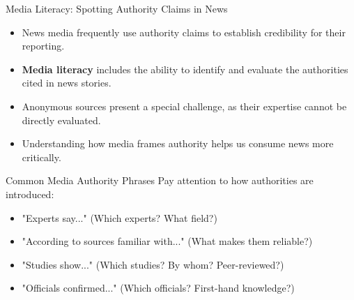 \documentclass{beamer}
\begin{document}
\begin{frame}{Media Literacy: Spotting Authority Claims in News}
    \begin{itemize}
        \item News media frequently use authority claims to establish credibility for their reporting.
        \item \textbf{Media literacy} includes the ability to identify and evaluate the authorities cited in news stories.
        \item Anonymous sources present a special challenge, as their expertise cannot be directly evaluated.
        \item Understanding how media frames authority helps us consume news more critically.
    \end{itemize}
    
    \begin{block}{Common Media Authority Phrases}
        Pay attention to how authorities are introduced:
        \begin{itemize}
            \item "Experts say..." (Which experts? What field?)
            \item "According to sources familiar with..." (What makes them reliable?)
            \item "Studies show..." (Which studies? By whom? Peer-reviewed?)
            \item "Officials confirmed..." (Which officials? First-hand knowledge?)
        \end{itemize}
    \end{block}
\end{frame}
\end{document}
